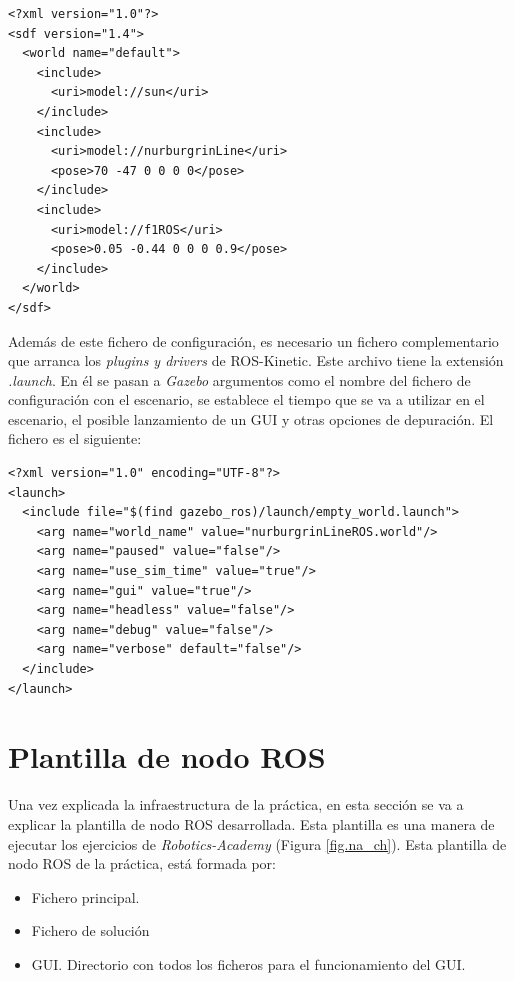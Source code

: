 \lstset{language=XML, breaklines=true, basicstyle=\footnotesize}
\begin{lstlisting}[frame=single]
<?xml version="1.0"?>
<sdf version="1.4">
  <world name="default">
    <include>
      <uri>model://sun</uri>
    </include>
    <include>
      <uri>model://nurburgrinLine</uri>
      <pose>70 -47 0 0 0 0</pose>
    </include>
    <include>
      <uri>model://f1ROS</uri>
      <pose>0.05 -0.44 0 0 0 0.9</pose>
    </include>
  </world>
</sdf>
\end{lstlisting}

Además de este fichero de configuración, es necesario un fichero complementario que arranca los \textit{plugins y drivers} de ROS-Kinetic. Este archivo tiene la extensión \textit{.launch}. En él se pasan a \textit{Gazebo} argumentos como el nombre del fichero de configuración con el escenario, se establece el tiempo que se va a utilizar en el escenario, el posible lanzamiento de un GUI y otras opciones de depuración.
El fichero es el siguiente:

\lstset{language=XML, breaklines=true, basicstyle=\footnotesize}
\begin{lstlisting}[frame=single]
<?xml version="1.0" encoding="UTF-8"?>
<launch>
  <include file="$(find gazebo_ros)/launch/empty_world.launch">
    <arg name="world_name" value="nurburgrinLineROS.world"/>
    <arg name="paused" value="false"/>
    <arg name="use_sim_time" value="true"/>
    <arg name="gui" value="true"/>
    <arg name="headless" value="false"/>
    <arg name="debug" value="false"/>
    <arg name="verbose" default="false"/>
  </include>
</launch>
\end{lstlisting}

\section{Plantilla de nodo ROS}
Una vez explicada la infraestructura de la práctica, en esta sección se va a explicar la plantilla de nodo ROS desarrollada. Esta plantilla es una manera de ejecutar los ejercicios de \textit{Robotics-Academy} (Figura \ref{fig.na_ch}). Esta plantilla de nodo ROS de la práctica, está formada por:

\begin{itemize}
    \item Fichero principal.
    \item Fichero de solución
    \item GUI. Directorio con todos los ficheros para el funcionamiento del GUI.
\end{itemize}

